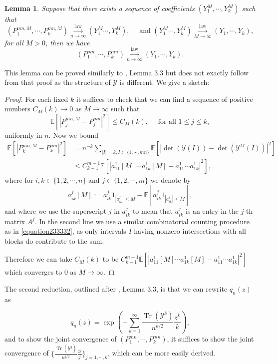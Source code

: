 \documentclass[12pt, reqno]{amsart}
\newtheorem{lemma}[theorem]{Lemma}
\theoremstyle{definition}
\theoremstyle{remark}
\numberwithin{equation}{section}
\begin{document}
\begin{lemma}\label{whatisnewlemma2.3}
Suppose that there exists a sequence of coefficients $(Y_1^M,\cdots,Y_k^M)$ such that 
$$ (P_1^{mn,M},\cdots,P_k^{mn,M})
\overset{\text{law}}{\underset{n\to\infty}{\longrightarrow}} (Y_1^M\cdots,Y_k^M),\quad \text{ and } (Y_1^M\cdots,Y_k^M)\overset{\text{law}}{\underset{M\to\infty}{\longrightarrow}} (Y_1,\cdots,Y_k), 
$$for all $M>0$, then we have 
$$
(P_1^{mn},\cdots,P_k^{mn})\overset{\text{law}}{\underset{n\to\infty}{\longrightarrow}} (Y_1,\cdots,Y_k).
$$
\end{lemma}    
This lemma can be proved similarly to \cite{bordenave2021convergence} , Lemma 3.3 but does not exactly follow from that proof as the structure of $\mathcal{Y}$ is different. We give a sketch:

\begin{proof}
For each fixed $k$ it suffices to check that we can find a sequence of positive numbers $C_M(k)\to 0$ as $M\to\infty$ such that 
    $$
\mathbb{E}[|P_j^{mn,M}-P_j^{mn}|^2]\leq C_M(k),\quad\text{ for all }1\leq j\leq k,
$$ uniformly in $n$.
    Now we bound
    $$\begin{aligned}
\mathbb{E}[|P_k^{mn,M}-P_k^{mn}|^2]&=n^{-k} \sum_{|I|=k,I\subset\{1,\cdots,mn\}} \mathbb{E}[|\det(\mathcal{Y}(I))-\det(\mathcal{Y}^M(I))|^2]\\&\leq C_{k-1}^{m-1}\mathbb{E}[|a_{11}^1[M]\cdots a_{1k}^1[M]-a_{11}^1\cdots a_{1k}^1|^2],
    \end{aligned}$$ where for $i,k\in\{1,2,\cdots,n\}$ and $j\in\{1,2,\cdots,m\}$ we denote by $$a_{ik}^j[M]:=a_{ik}^j1_{|a_{ik}^j|\leq M}-\mathbb{E}[a_{ik}^j1_{|a_{ik}^j|\leq M}],$$ and where we use the superscript $j$ in $a_{ik}^j$ to mean that $a_{ik}^j$ is an entry in the $j$-th matrix $A^j$. In the second line we use a similar combinatorial counting procedure as in \eqref{equation233332}, as only intervals $I$ having nonzero intersections with all blocks do contribute to the sum.

    
    Therefore we can take $C_M(k)$ to be $C_{k-1}^{m-1}\mathbb{E}[|a_{11}^1[M]\cdots a_{1k}^1[M]-a_{11}^1\cdots a_{1k}^1|^2]$ which converges to $0$ as $M\to\infty$.
\end{proof}



The second reduction, outlined after \cite{bordenave2021convergence}, Lemma 3.3, is that we can rewrite $q_n(z)$ as

\begin{equation}
q_n(z)=\exp\left(-\sum_{k=1}^\infty \frac{\operatorname{Tr}(\mathcal{Y}^k)}{n^{k/2}}\frac{z^k}{k}\right),
\end{equation} and to show the joint convergence of $(P_1^{mn},\cdots,P_k^{mn})$, it suffices to show the joint convergence of $\{\frac{\operatorname{Tr}(\mathcal{Y}^j)}{n^{j/2}}\frac{z^j}{j}\}_{j=1,\cdots,k}$, which can be more easily derived.
\end{document}
